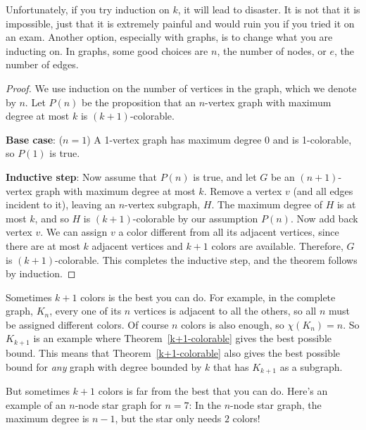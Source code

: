 Unfortunately, if you try induction on $k$, it will lead to disaster.  It
is not that it is impossible, just that it is extremely painful and would
ruin you if you tried it on an exam.  Another option, especially with
graphs, is to change what you are inducting on.  In graphs, some good
choices are $n$, the number of nodes, or $e$, the number of edges.

\begin{proof}
We use induction on the number of vertices in the graph, which we
denote by $n$.  Let $P(n)$ be the proposition that an $n$-vertex graph
with maximum degree at most $k$ is $(k+1)$-colorable.

\textbf{Base case}: ($n=1$) A 1-vertex graph has maximum degree 0 and is
1-colorable, so $P(1)$ is true.

\textbf{Inductive step}: Now assume that $P(n)$ is true, and let $G$ be an
$(n+1)$-vertex graph with maximum degree at most $k$.  Remove a vertex $v$
(and all edges incident to it), leaving an $n$-vertex subgraph, $H$.  The
maximum degree of $H$ is at most $k$, and so $H$ is $(k+1)$-colorable by
our assumption $P(n)$.  Now add back vertex $v$.  We can assign $v$ a
color different from all its adjacent vertices, since there are at
most $k$ adjacent vertices and $k+1$ colors are available.  Therefore, $G$
is $(k+1)$-colorable.  This completes the inductive step, and the theorem
follows by induction.
\end{proof}

Sometimes $k+1$ colors is the best you can do.  For example, in the
complete graph, $K_n$, every one of its $n$ vertices is adjacent to all
the others, so all $n$ must be assigned different colors.  Of course $n$
colors is also enough, so $\chi(K_n)=n$.  So $K_{k+1}$ is an example where
Theorem~\ref{k+1-colorable} gives the best possible bound.  This means
that Theorem~\ref{k+1-colorable} also gives the best possible bound for
\emph{any} graph with degree bounded by $k$ that has $K_{k+1}$ as a
subgraph.

But sometimes $k+1$ colors is far from the best that you can do.  Here's
an example of an $n$-node star graph for $n=7$:
In the $n$-node star graph, the maximum degree is $n-1$, but the star only
needs $2$ colors!

